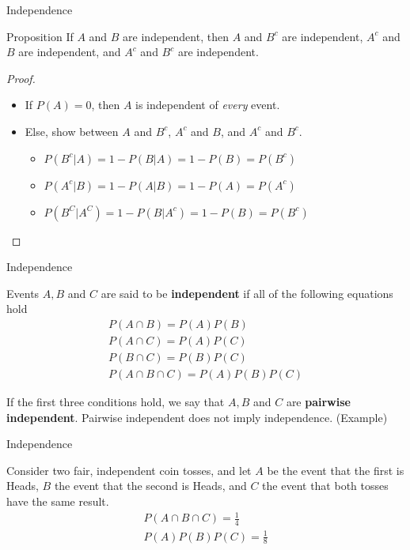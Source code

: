 \documentclass{beamer}
\newcommand{\tb}[1]{\textbf{#1}}
\newcommand{\ti}[1]{\textit{#1}}
\begin{document}
\begin{frame}{Independence}
    \begin{block}{Proposition}
        If $A$ and $B$ are independent, then $A$ and $B^c$ are independent, $A^c$ and $B$ are independent, and $A^c$ and $B^c$ are independent.
    \end{block}

    \begin{proof}
        \begin{itemize}
            \item If $P(A)=0$, then $A$ is independent of \ti{every} event.
            \item Else, show between $A$ and $B^c$, $A^c$ and $B$, and $A^c$ and $B^c$.
            \begin{itemize}
                \item $P(B^c|A) = 1 - P(B|A) = 1 - P(B) = P(B^c)$
                \item $P(A^c|B) = 1- P(A|B) = 1 - P(A) = P(A^c)$
                \item $P(B^C|A^C) = 1 - P(B|A^c) = 1- P(B) = P(B^c)$
            \end{itemize}
        \end{itemize}
    \end{proof}
\end{frame}


\begin{frame}{Independence}
    \begin{definition}
        Events $A,B$ and $C$ are said to be \tb{independent} if all of the following equations hold
        \[
        \begin{gathered}
            P(A\cap B) = P(A)P(B) \\
            P(A\cap C) = P(A)P(C)\\
            P(B\cap C) = P(B)P(C)\\
            P(A\cap B\cap C) = P(A)P(B)P(C)
        \end{gathered}
        \]
    \end{definition}
    If the first three conditions hold, we say that $A,B$ and $C$ are \tb{pairwise independent}. Pairwise independent does not imply independence. (Example)
\end{frame}

\begin{frame}{Independence}
    \begin{example}
        Consider two fair, independent coin tosses, and let $A$ be the event that the first is Heads, $B$ the event that the second is Heads, and $C$ the event that both tosses have the same result.\newline
        \[
        \begin{gathered}
            P(A \cap B \cap C) = \frac{1}{4}\\
            P(A)P(B)P(C) = \frac{1}{8}
        \end{gathered}
        \]
    \end{example}
\end{frame}
\end{document}
